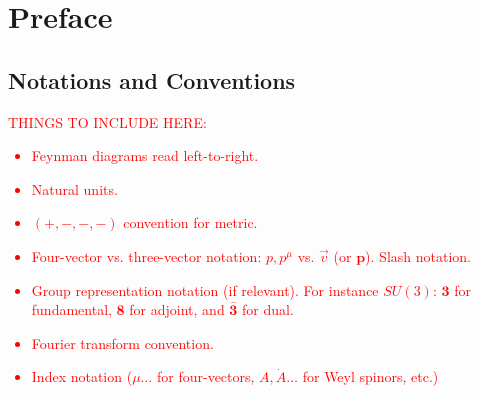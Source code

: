
\chapter*{Preface}

\section*{Notations and Conventions}

\textcolor{red}{THINGS TO INCLUDE HERE:
\begin{itemize}
    \item Feynman diagrams read left-to-right.
    \item Natural units.
    \item $(+,-,-,-)$ convention for metric.
    \item Four-vector vs. three-vector notation: $p,p^\mu$ vs. $\vec{v}$ (or $\mathbf{p}$). Slash notation.
    \item Group representation notation (if relevant). For instance $SU(3)$: $\mathbf{3}$ for fundamental, $\mathbf{8}$ for adjoint, and $\bar{\mathbf{3}}$ for dual.
    \item Fourier transform convention.
    \item Index notation ($\mu\ldots$ for four-vectors, $A,\dot{A}\ldots$ for Weyl spinors, etc.)
\end{itemize}
}